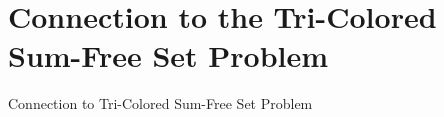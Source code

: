 \section{Connection to the Tri-Colored Sum-Free Set Problem}
\begin{frame}{Connection to Tri-Colored Sum-Free Set Problem}
	
\end{frame}